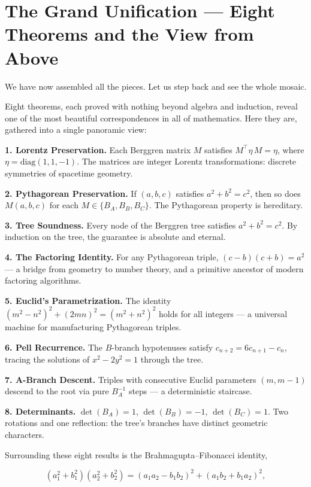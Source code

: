 \documentclass[11pt,openright,twoside]{book}
\theoremstyle{definition}
\begin{document}
\bigskip


\section{The Grand Unification — Eight Theorems and the View from Above}

We have now assembled all the pieces. Let us step back and see the whole mosaic.

Eight theorems, each proved with nothing beyond algebra and induction, reveal one of the most beautiful correspondences in all of mathematics. Here they are, gathered into a single panoramic view:

\textbf{1. Lorentz Preservation.} Each Berggren matrix $M$ satisfies $M^\top \eta\, M = \eta$, where $\eta = \mathrm{diag}(1, 1, -1)$. The matrices are integer Lorentz transformations: discrete symmetries of spacetime geometry.

\textbf{2. Pythagorean Preservation.} If $(a, b, c)$ satisfies $a^2 + b^2 = c^2$, then so does $M(a, b, c)$ for each $M \in \{B_A, B_B, B_C\}$. The Pythagorean property is hereditary.

\textbf{3. Tree Soundness.} Every node of the Berggren tree satisfies $a^2 + b^2 = c^2$. By induction on the tree, the guarantee is absolute and eternal.

\textbf{4. The Factoring Identity.} For any Pythagorean triple, $(c - b)(c + b) = a^2$ --- a bridge from geometry to number theory, and a primitive ancestor of modern factoring algorithms.

\textbf{5. Euclid's Parametrization.} The identity $(m^2 - n^2)^2 + (2mn)^2 = (m^2 + n^2)^2$ holds for all integers --- a universal machine for manufacturing Pythagorean triples.

\textbf{6. Pell Recurrence.} The $B$-branch hypotenuses satisfy $c_{n+2} = 6c_{n+1} - c_n$, tracing the solutions of $x^2 - 2y^2 = 1$ through the tree.

\textbf{7. A-Branch Descent.} Triples with consecutive Euclid parameters $(m, m-1)$ descend to the root via pure $B_A^{-1}$ steps --- a deterministic staircase.

\textbf{8. Determinants.} $\det(B_A) = 1$, $\det(B_B) = -1$, $\det(B_C) = 1$. Two rotations and one reflection: the tree's branches have distinct geometric characters.

Surrounding these eight results is the Brahmagupta--Fibonacci identity,

\[(a_1^2 + b_1^2)(a_2^2 + b_2^2) = (a_1 a_2 - b_1 b_2)^2 + (a_1 b_2 + b_1 a_2)^2,\]
\end{document}
